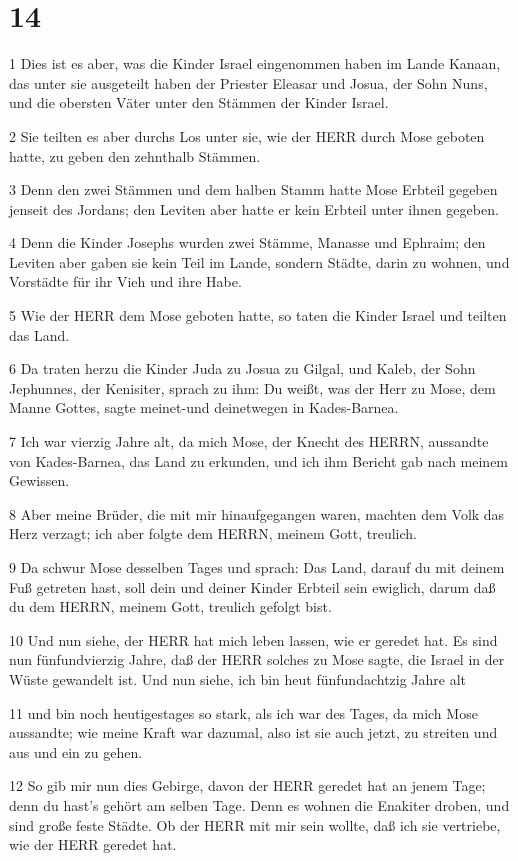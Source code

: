 \chapter{14}

\par 1 Dies ist es aber, was die Kinder Israel eingenommen haben im Lande Kanaan, das unter sie ausgeteilt haben der Priester Eleasar und Josua, der Sohn Nuns, und die obersten Väter unter den Stämmen der Kinder Israel.
\par 2 Sie teilten es aber durchs Los unter sie, wie der HERR durch Mose geboten hatte, zu geben den zehnthalb Stämmen.
\par 3 Denn den zwei Stämmen und dem halben Stamm hatte Mose Erbteil gegeben jenseit des Jordans; den Leviten aber hatte er kein Erbteil unter ihnen gegeben.
\par 4 Denn die Kinder Josephs wurden zwei Stämme, Manasse und Ephraim; den Leviten aber gaben sie kein Teil im Lande, sondern Städte, darin zu wohnen, und Vorstädte für ihr Vieh und ihre Habe.
\par 5 Wie der HERR dem Mose geboten hatte, so taten die Kinder Israel und teilten das Land.
\par 6 Da traten herzu die Kinder Juda zu Josua zu Gilgal, und Kaleb, der Sohn Jephunnes, der Kenisiter, sprach zu ihm: Du weißt, was der Herr zu Mose, dem Manne Gottes, sagte meinet-und deinetwegen in Kades-Barnea.
\par 7 Ich war vierzig Jahre alt, da mich Mose, der Knecht des HERRN, aussandte von Kades-Barnea, das Land zu erkunden, und ich ihm Bericht gab nach meinem Gewissen.
\par 8 Aber meine Brüder, die mit mir hinaufgegangen waren, machten dem Volk das Herz verzagt; ich aber folgte dem HERRN, meinem Gott, treulich.
\par 9 Da schwur Mose desselben Tages und sprach: Das Land, darauf du mit deinem Fuß getreten hast, soll dein und deiner Kinder Erbteil sein ewiglich, darum daß du dem HERRN, meinem Gott, treulich gefolgt bist.
\par 10 Und nun siehe, der HERR hat mich leben lassen, wie er geredet hat. Es sind nun fünfundvierzig Jahre, daß der HERR solches zu Mose sagte, die Israel in der Wüste gewandelt ist. Und nun siehe, ich bin heut fünfundachtzig Jahre alt
\par 11 und bin noch heutigestages so stark, als ich war des Tages, da mich Mose aussandte; wie meine Kraft war dazumal, also ist sie auch jetzt, zu streiten und aus und ein zu gehen.
\par 12 So gib mir nun dies Gebirge, davon der HERR geredet hat an jenem Tage; denn du hast's gehört am selben Tage. Denn es wohnen die Enakiter droben, und sind große feste Städte. Ob der HERR mit mir sein wollte, daß ich sie vertriebe, wie der HERR geredet hat.
